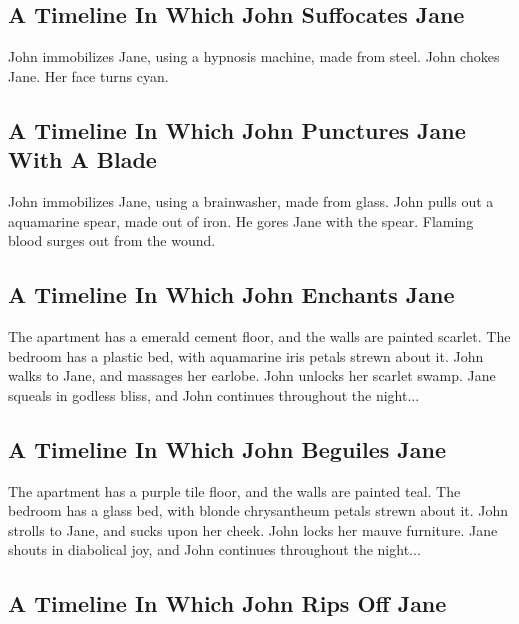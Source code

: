 \documentclass{article}
\begin{document}
\subsection{A Timeline In Which John Suffocates Jane}


John immobilizes Jane, using a hypnosis machine, made from steel.
John chokes Jane.
Her face turns cyan.
\subsection{A Timeline In Which John Punctures Jane With A Blade}


John immobilizes Jane, using a brainwasher, made from glass.
John pulls out a aquamarine spear, made out of iron.
He gores Jane with the spear.
Flaming blood surges out from the wound.
\subsection{A Timeline In Which John Enchants Jane}


The apartment has a emerald cement floor, and the walls are painted scarlet.
The bedroom has a plastic bed, with aquamarine iris petals strewn about it.
John walks to Jane, and massages her earlobe.
John unlocks her scarlet swamp.
Jane squeals in godless bliss, and John continues throughout the night...
\subsection{A Timeline In Which John Beguiles Jane}


The apartment has a purple tile floor, and the walls are painted teal.
The bedroom has a glass bed, with blonde chrysantheum petals strewn about it.
John strolls to Jane, and sucks upon her cheek.
John locks her mauve furniture.
Jane shouts in diabolical joy, and John continues throughout the night...
\subsection{A Timeline In Which John Rips Off Jane}
\end{document}
